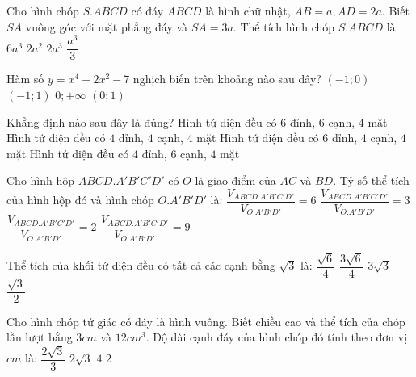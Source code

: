 \begin{ex}%
	Cho hình chóp $ S.ABCD $ có đáy $ ABCD $ là hình chữ nhật, $ AB=a, AD=2a. $ Biết $ SA $ vuông góc với mặt phẳng đáy và $ SA=3a $. Thể tích hình chóp $ S.ABCD $ là:
	\choice
	{$ 6a^3 $}
	{$ 2a^2 $}
	{\True $ 2a^3 $}
	{$ \dfrac{a^3}{3} $}
\end{ex}
\begin{ex}%
	Hàm số $ y=x^4-2x^2-7 $ nghịch biến trên khoảng nào sau đây?
	\choice
	{$ (-1;0) $}
	{$ (-1;1) $}
	{$ 0;+\infty $}
	{\True $ (0;1) $}
\end{ex}
\begin{ex}%
	Khẳng định nào sau đây là đúng?
	\choice
	{Hình tứ diện đều có $ 6 $ đỉnh, $ 6 $ cạnh, $ 4 $ mặt}
	{Hình tứ diện đều có $ 4 $ đỉnh, $ 4 $ cạnh, $ 4 $ mặt}
	{Hình tứ diện đều có $ 6 $ đỉnh, $ 4 $ cạnh, $ 4 $ mặt}
	{\True Hình tứ diện đều có $ 4 $ đỉnh, $ 6 $ cạnh, $ 4 $ mặt}
	\loigiai{}
\end{ex}
\begin{ex}%
	Cho hình hộp $ ABCD.A'B'C'D' $ có $ O $ là giao điểm của $ AC $ và $ BD $. Tỷ số thể tích của hình hộp đó và hình chóp $ O.A'B'D' $ là:
	\choice
	{\True $ \dfrac{V_{ABCD.A'B'C'D'}}{V_{O.A'B'D'}}=6 $}
	{$ \dfrac{V_{ABCD.A'B'C'D'}}{V_{O.A'B'D'}}=3 $}
	{$ \dfrac{V_{ABCD.A'B'C'D'}}{V_{O.A'B'D'}}=2 $}
	{$ \dfrac{V_{ABCD.A'B'C'D'}}{V_{O.A'B'D'}}=9 $}
\end{ex}
\begin{ex}%
	Thể tích của khối tứ diện đều có tất cả các cạnh bằng $ \sqrt{3} $ là:
	\choice
	{\True $\dfrac{\sqrt{6}}{4}$}
	{$ \dfrac{3\sqrt{6}}{4} $}
	{$ 3\sqrt{3} $}
	{$ \dfrac{\sqrt{3}}{2} $}
\end{ex}
\begin{ex}%
	Cho hình chóp tứ giác có đáy là hình vuông. Biết chiều cao và thể tích của chóp lần lượt bằng $ 3 cm $ và $ 12 cm^3 $. Độ dài cạnh đáy của hình chóp đó tính theo đơn vị $ cm $ là:
	\choice
	{$ \dfrac{2\sqrt{3}}{3} $}
	{\True $ 2\sqrt{3} $}
	{$ 4 $}
	{$ 2 $}
\end{ex}
